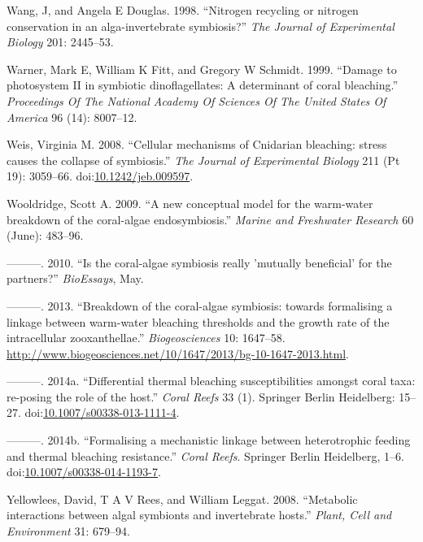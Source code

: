 \documentclass[]{elsarticle} %
\begin{document}
\hypertarget{ref-Wang:1998p128}{}
Wang, J, and Angela E Douglas. 1998. ``Nitrogen recycling or nitrogen
conservation in an alga-invertebrate symbiosis?'' \emph{The Journal of
Experimental Biology} 201: 2445--53.

\hypertarget{ref-Warner:1999p4239}{}
Warner, Mark E, William K Fitt, and Gregory W Schmidt. 1999. ``Damage to
photosystem II in symbiotic dinoflagellates: A determinant of coral
bleaching.'' \emph{Proceedings Of The National Academy Of Sciences Of
The United States Of America} 96 (14): 8007--12.

\hypertarget{ref-Weis:2008p944}{}
Weis, Virginia M. 2008. ``Cellular mechanisms of Cnidarian bleaching:
stress causes the collapse of symbiosis.'' \emph{The Journal of
Experimental Biology} 211 (Pt 19): 3059--66.
doi:\href{https://doi.org/10.1242/jeb.009597}{10.1242/jeb.009597}.

\hypertarget{ref-Wooldridge:2009p7807}{}
Wooldridge, Scott A. 2009. ``A new conceptual model for the warm-water
breakdown of the coral-algae endosymbiosis.'' \emph{Marine and
Freshwater Research} 60 (June): 483--96.

\hypertarget{ref-Wooldridge:2010p7809}{}
---------. 2010. ``Is the coral-algae symbiosis really 'mutually
beneficial' for the partners?'' \emph{BioEssays}, May.

\hypertarget{ref-Wooldridge:2013tj}{}
---------. 2013. ``Breakdown of the coral-algae symbiosis: towards
formalising a linkage between warm-water bleaching thresholds and the
growth rate of the intracellular zooxanthellae.'' \emph{Biogeosciences}
10: 1647--58.
\url{http://www.biogeosciences.net/10/1647/2013/bg-10-1647-2013.html}.

\hypertarget{ref-Wooldridge:2014di}{}
---------. 2014a. ``Differential thermal bleaching susceptibilities
amongst coral taxa: re-posing the role of the host.'' \emph{Coral Reefs}
33 (1). Springer Berlin Heidelberg: 15--27.
doi:\href{https://doi.org/10.1007/s00338-013-1111-4}{10.1007/s00338-013-1111-4}.

\hypertarget{ref-Wooldridge:2014hc}{}
---------. 2014b. ``Formalising a mechanistic linkage between
heterotrophic feeding and thermal bleaching resistance.'' \emph{Coral
Reefs}. Springer Berlin Heidelberg, 1--6.
doi:\href{https://doi.org/10.1007/s00338-014-1193-7}{10.1007/s00338-014-1193-7}.

\hypertarget{ref-Yellowlees:2008p331}{}
Yellowlees, David, T A V Rees, and William Leggat. 2008. ``Metabolic
interactions between algal symbionts and invertebrate hosts.''
\emph{Plant, Cell and Environment} 31: 679--94.
\end{document}
